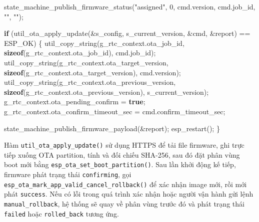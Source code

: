 \documentclass[a4paper]{extarticle}
\newenvironment{Shaded}{}{}
\newcommand{\ControlFlowTok}[1]{\textcolor[rgb]{0.00,0.44,0.13}{\textbf{#1}}}
\newcommand{\DecValTok}[1]{\textcolor[rgb]{0.25,0.63,0.44}{#1}}
\newcommand{\KeywordTok}[1]{\textcolor[rgb]{0.00,0.44,0.13}{\textbf{#1}}}
\newcommand{\NormalTok}[1]{#1}
\newcommand{\OperatorTok}[1]{\textcolor[rgb]{0.40,0.40,0.40}{#1}}
\newcommand{\StringTok}[1]{\textcolor[rgb]{0.25,0.44,0.63}{#1}}
\begin{document}
\begin{Shaded}
\begin{Highlighting}[]
\NormalTok{state\_machine\_publish\_firmware\_status}\OperatorTok{(}\StringTok{"assigned"}\OperatorTok{,} \DecValTok{0}\OperatorTok{,}\NormalTok{ cmd}\OperatorTok{.}\NormalTok{version}\OperatorTok{,}\NormalTok{ cmd}\OperatorTok{.}\NormalTok{job\_id}\OperatorTok{,} \StringTok{""}\OperatorTok{,} \StringTok{""}\OperatorTok{);}

\ControlFlowTok{if} \OperatorTok{(}\NormalTok{util\_ota\_apply\_update}\OperatorTok{(\&}\NormalTok{s\_config}\OperatorTok{,}\NormalTok{ s\_current\_version}\OperatorTok{,} \OperatorTok{\&}\NormalTok{cmd}\OperatorTok{,} \OperatorTok{\&}\NormalTok{report}\OperatorTok{)} \OperatorTok{==}\NormalTok{ ESP\_OK}\OperatorTok{)} \OperatorTok{\{}
\NormalTok{    util\_copy\_string}\OperatorTok{(}\NormalTok{g\_rtc\_context}\OperatorTok{.}\NormalTok{ota\_job\_id}\OperatorTok{,} \KeywordTok{sizeof}\OperatorTok{(}\NormalTok{g\_rtc\_context}\OperatorTok{.}\NormalTok{ota\_job\_id}\OperatorTok{),}\NormalTok{ cmd}\OperatorTok{.}\NormalTok{job\_id}\OperatorTok{);}
\NormalTok{    util\_copy\_string}\OperatorTok{(}\NormalTok{g\_rtc\_context}\OperatorTok{.}\NormalTok{ota\_target\_version}\OperatorTok{,} \KeywordTok{sizeof}\OperatorTok{(}\NormalTok{g\_rtc\_context}\OperatorTok{.}\NormalTok{ota\_target\_version}\OperatorTok{),}\NormalTok{ cmd}\OperatorTok{.}\NormalTok{version}\OperatorTok{);}
\NormalTok{    util\_copy\_string}\OperatorTok{(}\NormalTok{g\_rtc\_context}\OperatorTok{.}\NormalTok{ota\_previous\_version}\OperatorTok{,} \KeywordTok{sizeof}\OperatorTok{(}\NormalTok{g\_rtc\_context}\OperatorTok{.}\NormalTok{ota\_previous\_version}\OperatorTok{),}\NormalTok{ s\_current\_version}\OperatorTok{);}
\NormalTok{    g\_rtc\_context}\OperatorTok{.}\NormalTok{ota\_pending\_confirm }\OperatorTok{=} \KeywordTok{true}\OperatorTok{;}
\NormalTok{    g\_rtc\_context}\OperatorTok{.}\NormalTok{ota\_confirm\_timeout\_sec }\OperatorTok{=}\NormalTok{ cmd}\OperatorTok{.}\NormalTok{confirm\_timeout\_sec}\OperatorTok{;}

\NormalTok{    state\_machine\_publish\_firmware\_payload}\OperatorTok{(\&}\NormalTok{report}\OperatorTok{);}
\NormalTok{    esp\_restart}\OperatorTok{();}
\OperatorTok{\}}
\end{Highlighting}
\end{Shaded}

Hàm \texttt{util\_ota\_apply\_update()} sử dụng HTTPS để tải file
firmware, ghi trực tiếp xuống OTA partition, tính và đối chiếu SHA-256,
sau đó đặt phân vùng boot mới bằng
\texttt{esp\_ota\_set\_boot\_partition()}. Sau lần khởi động kế tiếp,
firmware phát trạng thái \texttt{confirming}, gọi
\texttt{esp\_ota\_mark\_app\_valid\_cancel\_rollback()} để xác nhận
image mới, rồi mới phát \texttt{success}. Nếu có lỗi trong quá trình xác
nhận hoặc người vận hành gửi lệnh \texttt{manual\_rollback}, hệ thống sẽ
quay về phân vùng trước đó và phát trạng thái \texttt{failed} hoặc
\texttt{rolled\_back} tương ứng.
\end{document}

